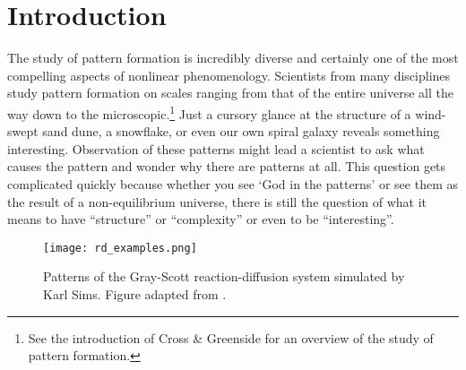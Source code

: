 		
\chapter*{Introduction}
The study of pattern formation is incredibly diverse and certainly one of the most compelling aspects of nonlinear phenomenology. Scientists from many disciplines study pattern formation on scales ranging from that of the entire universe all the way down to the microscopic.\footnote{See the introduction of Cross \& Greenside for an overview of the study of pattern formation.} Just a cursory glance at the structure of a wind-swept sand dune, a snowflake, or even our own spiral galaxy reveals something interesting. Observation of these patterns might lead a scientist to ask what causes the pattern and wonder why there are patterns at all. This question gets complicated quickly because whether you see `God in the patterns' or see them as the result of a non-equilibrium universe, there is still the question of what it means to have ``structure'' or ``complexity'' or even to be ``interesting''.
%
\begin{figure}[h]
	\centering
	\texttt{[image: rd\_examples.png]}
	\caption{Patterns of the Gray-Scott reaction-diffusion system simulated by Karl Sims. Figure adapted from \protect{}.}
	\label{fig:karl_sims}
\end{figure}

